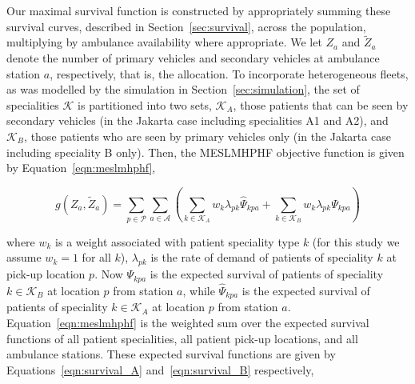 \documentclass[preprint,12pt]{elsarticle}
\begin{document}



Our maximal survival function is constructed by appropriately summing these
survival curves, described in Section~\ref{sec:survival}, across the population,
multiplying by ambulance availability where appropriate.  We let $Z_a$ and
$\tilde{Z}_a$ denote the number of primary vehicles and secondary vehicles at
ambulance station $a$, respectively, that is, the allocation. To incorporate
heterogeneous fleets, as was modelled by the simulation in
Section~\ref{sec:simulation}, the set of specialities $\mathcal{K}$ is
partitioned into two sets, $\mathcal{K}_A$, those patients that can be seen by
secondary vehicles (in the Jakarta case including specialities A1 and A2), and
$\mathcal{K}_B$, those patients who are seen by primary vehicles only (in the
Jakarta case including speciality B only). Then, the MESLMHPHF objective
function is given by Equation~\ref{eqn:meslmhphf},

\begin{equation}\label{eqn:meslmhphf} g\left(Z_a, \tilde{Z}_a\right) = \sum_{p
    \in \mathcal{P}} \sum_{a \in \mathcal{A}} \left( \sum_{k \in \mathcal{K}_A}
    w_k \lambda_{pk} \hat{\Psi}_{kpa} + \sum_{k \in \mathcal{K}_B}  w_k
    \lambda_{pk} \Psi_{kpa} \right) \end{equation}

where $w_k$ is a weight associated with patient speciality type $k$ (for this
study we assume $w_k = 1$ for all $k$), $\lambda_{pk}$ is the rate of demand of
patients of speciality $k$ at pick-up location $p$. Now $\Psi_{kpa}$ is the
expected survival of patients of speciality $k \in \mathcal{K}_B$ at location
$p$ from station $a$, while $\hat{\Psi}_{kpa}$ is the expected survival of
patients of speciality $k \in \mathcal{K}_A$ at location $p$ from station $a$.
Equation~\ref{eqn:meslmhphf} is the weighted sum over the expected survival
functions of all patient specialities, all patient pick-up locations, and all
ambulance stations. These expected survival functions are given by
Equations~\ref{eqn:survival_A} and~\ref{eqn:survival_B} respectively,
\end{document}

